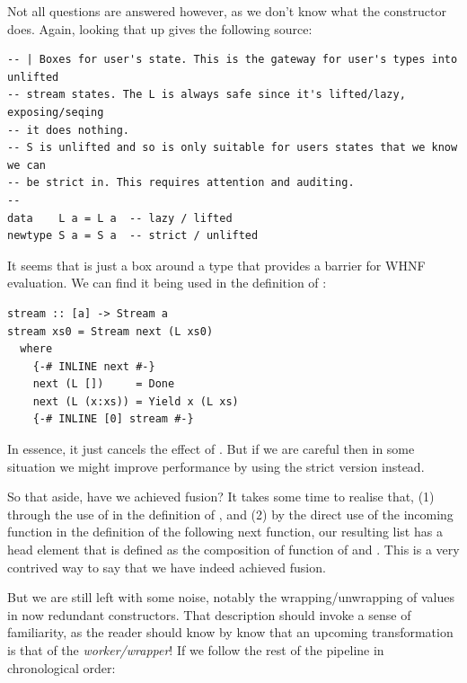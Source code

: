 Not all questions are answered however, as we don't know what the  constructor does. Again, looking that up gives the following source:

\begin{listing}[H]
\begin{verbatim}
-- | Boxes for user's state. This is the gateway for user's types into unlifted
-- stream states. The L is always safe since it's lifted/lazy, exposing/seqing
-- it does nothing.
-- S is unlifted and so is only suitable for users states that we know we can
-- be strict in. This requires attention and auditing. 
--
data    L a = L a  -- lazy / lifted
newtype S a = S a  -- strict / unlifted
\end{verbatim}
\end{listing}

It seems that  is just a box around a type that provides a barrier for WHNF evaluation. We can find it being used in the
definition of :

\begin{listing}[H]
\begin{verbatim}
stream :: [a] -> Stream a
stream xs0 = Stream next (L xs0)
  where
    {-# INLINE next #-}
    next (L [])     = Done
    next (L (x:xs)) = Yield x (L xs)
    {-# INLINE [0] stream #-}
\end{verbatim}
\end{listing}

In essence, it just cancels the effect of . But if we are careful then in some situation we might improve performance by using the
strict version  instead. 

So that aside, have we achieved fusion? It takes some time to realise that, (1) through the use of  in the definition of , and (2)
by the direct use of the incoming  function in the definition of the following next function, our resulting list has a head element that is defined
as the composition of  function of  and . This is a very contrived way to say that we have indeed achieved fusion.

But we are still left with some noise, notably the wrapping/unwrapping of values in now redundant  constructors. That description should invoke
a sense of familiarity, as the reader should know by know that an upcoming transformation is that of the \textit{worker/wrapper}!
If we follow the rest of the pipeline in chronological order:

